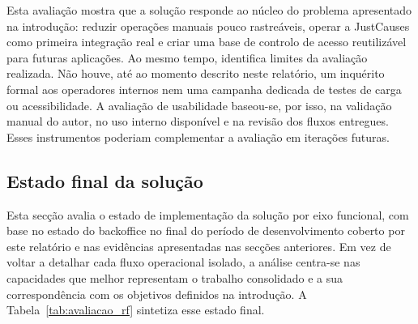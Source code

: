 Esta avaliação mostra que a solução responde ao núcleo do problema apresentado na introdução: reduzir operações manuais pouco rastreáveis, operar a JustCauses como primeira integração real e criar uma base de controlo de acesso reutilizável para futuras aplicações. Ao mesmo tempo, identifica limites da avaliação realizada. Não houve, até ao momento descrito neste relatório, um inquérito formal aos operadores internos nem uma campanha dedicada de testes de carga ou acessibilidade. A avaliação de usabilidade baseou-se, por isso, na validação manual do autor, no uso interno disponível e na revisão dos fluxos entregues. Esses instrumentos poderiam complementar a avaliação em iterações futuras.

\subsection{Estado final da solução}
\label{subsec:estado_final_solucao}

Esta secção avalia o estado de implementação da solução por eixo funcional, com base no estado do backoffice no final do período de desenvolvimento coberto por este relatório e nas evidências apresentadas nas secções anteriores. Em vez de voltar a detalhar cada fluxo operacional isolado, a análise centra-se nas capacidades que melhor representam o trabalho consolidado e a sua correspondência com os objetivos definidos na introdução. A Tabela~\ref{tab:avaliacao_rf} sintetiza esse estado final.

